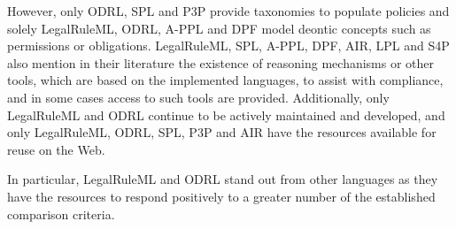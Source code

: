 However, only ODRL, SPL and P3P provide taxonomies to populate policies and solely LegalRuleML, ODRL, A-PPL and DPF model deontic concepts such as permissions or obligations.
LegalRuleML, SPL, A-PPL, DPF, AIR, LPL and S4P also mention in their literature the existence of reasoning mechanisms or other tools, which are based on the implemented languages, to assist with compliance, and in some cases access to such tools are provided.
Additionally, only LegalRuleML and ODRL continue to be actively maintained and developed, and only LegalRuleML, ODRL, SPL, P3P and AIR have the resources available for reuse on the Web.

In particular, LegalRuleML and ODRL stand out from other languages as they have the resources to respond positively to a greater number of the established comparison criteria.